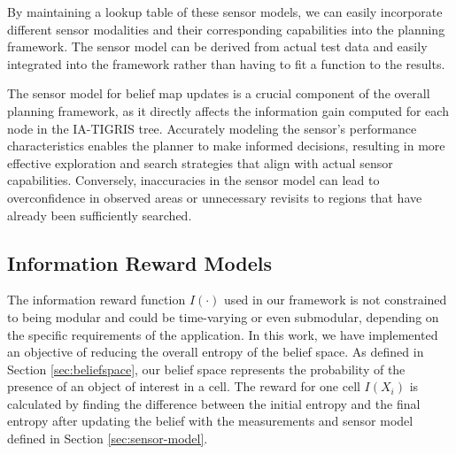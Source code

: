 


By maintaining a lookup table of these sensor models, we can easily incorporate different sensor modalities and their corresponding capabilities into the planning framework. The sensor model can be derived from actual test data and easily integrated into the framework rather than having to fit a function to the results.

The sensor model for belief map updates is a crucial component of the overall planning framework, as it directly affects the information gain computed for each node in the IA-TIGRIS tree. Accurately modeling the sensor’s performance characteristics enables the planner to make informed decisions, resulting in more effective exploration and search strategies that align with actual sensor capabilities. Conversely, inaccuracies in the sensor model can lead to overconfidence in observed areas or unnecessary revisits to regions that have already been sufficiently searched.

\subsection{Information Reward Models}\label{sec:reward-models}


The information reward function $I(\cdot)$ used in our framework is not constrained to being modular and could be time-varying or even submodular, depending on the specific requirements of the application. In this work, we have implemented an objective of reducing the overall entropy of the belief space. As defined in Section \ref{sec:beliefspace}, our belief space represents the probability of the presence of an object of interest in a cell. The reward for one cell $I(X_i)$ is calculated by finding the difference between the initial entropy and the final entropy after updating the belief with the measurements and sensor model defined in Section \ref{sec:sensor-model}.


